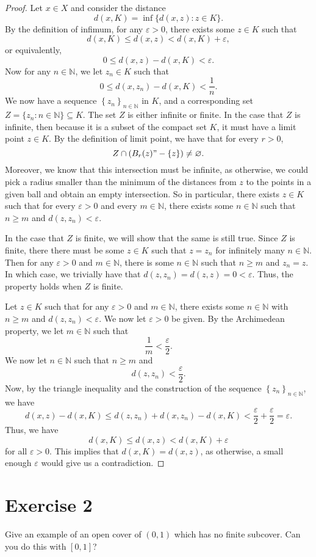 \documentclass[12pt]{article}
\newenvironment{problem}
    {\begin{lrbox}{\mybox}\begin{minipage}{\textwidth-10pt}}
    {\end{minipage}\end{lrbox}\framebox[6.5in]{\usebox{\mybox}}}
\newcommand{\seq}[2][n]{\left\{#2\right\}_{#1\in\N}}
\newcommand{\N}{\mathbb{N}}
\let\eps\varepsilon
\let\emptyset\varnothing
\begin{document}
\begin{proof}
    Let $x\in X$ and consider the distance
    \[d(x,K) = \inf\{d(x,z) : z\in K\}.\]
    By the definition of infimum, for any $\eps>0$, there exists some $z\in K$ such that
    \[d(x,K)\leq d(x,z) < d(x,K) + \eps,\]
    or equivalently,
    \[0 \leq d(x,z) - d(x,K) < \eps.\]
    Now for any $n\in\N$, we let $z_n\in K$ such that
    \[0\leq d(x,z_n) - d(x, K) < \frac1n.\]
    We now have a sequence $\seq{z_n}$ in $K$, and a corresponding set $Z=\{z_n : n\in\N\}\subseteq K$. The set $Z$ is either infinite or finite. In the case that $Z$ is infinite, then because it is a subset of the compact set $K$, it must have a limit point $z\in K$. By the definition of limit point, we have that for every $r>0$,
    \[Z\cap(B_r(z)"-\{z\}) \ne \emptyset.\]
    Moreover, we know that this intersection must be infinite, as otherwise, we could pick a radius smaller than the minimum of the distances from $z$ to the points in a given ball and obtain an empty intersection. So in particular, there exists $z\in K$ such that for every $\eps>0$ and every $m\in\N$, there exists some $n\in\N$ such that $n\geq m$ and $d(z,z_n)<\eps$.
    
    In the case that $Z$ is finite, we will show that the same is still true. Since $Z$ is finite, there there must be some $z\in K$ such that $z=z_n$ for infinitely many $n\in\N$. Then for any $\eps>0$ and $m\in\N$, there is some $n\in\N$ such that $n\geq m$ and $z_n=z$. In which case, we trivially have that $d(z,z_n) = d(z,z) = 0 < \eps$. Thus, the property holds when $Z$ is finite.
    
    Let $z\in K$ such that for any $\eps>0$ and $m\in\N$, there exists some $n\in\N$ with $n\geq m$ and $d(z,z_n)<\eps$. We now let $\eps>0$ be given. By the Archimedean property, we let $m\in\N$ such that
    \[\frac1m<\frac\eps2.\]
    We now let $n\in\N$ such that $n\geq m$ and
    \[d(z,z_n)<\frac\eps2.\]
    Now, by the triangle inequality and the construction of the sequence $\seq{z_n}$, we have
    \[d(x,z) - d(x,K) \leq d(z,z_n) + d(x,z_n) - d(x,K) < \frac\eps2 + \frac\eps2 = \eps.\]
    Thus, we have
    \[d(x,K) \leq d(x,z) < d(x,K) + \eps\]
    for all $\eps>0$. This implies that $d(x,K)=d(x,z)$, as otherwise, a small enough $\eps$ would give us a contradiction.
    

\end{proof}

\section*{Exercise 2}
\begin{problem}
    Give an example of an open cover of $(0,1)$ which has no finite subcover. Can you do this with $[0,1]$?
\end{problem}
\medskip
\end{document}
